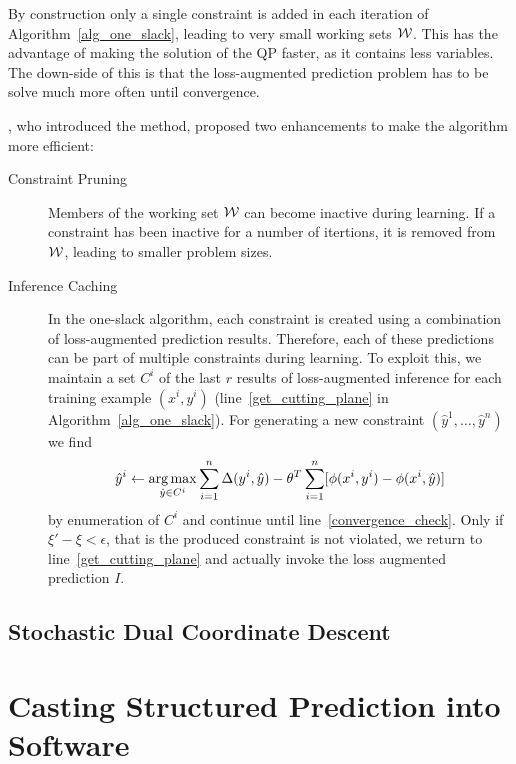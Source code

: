 By construction only a single constraint is added in each iteration of
Algorithm~\ref{alg_one_slack}, leading to very small working sets $\mathcal{W}$.
This has the advantage of making the solution of the QP faster, as it contains
less variables. The down-side of this is that the loss-augmented prediction
problem has to be solve much more often until convergence.

\citet{joachims2009cutting}, who introduced the method, proposed two enhancements
to make the algorithm more efficient:
\begin{description}
    \item[Constraint Pruning] Members of the working set $\mathcal{W}$ can become inactive during learning.
        If a constraint has been inactive for a number of itertions, it is removed from $\mathcal{W}$, leading
        to smaller problem sizes.
    \item[Inference Caching] In the one-slack algorithm, each constraint is
        created using a combination of loss-augmented prediction results.
        Therefore, each of these predictions can be part of multiple
        constraints during learning.
        To exploit this, we maintain a set $C^i$ of the last $r$ results of
        loss-augmented inference for each training example $(x^i, y^i)$
        (line~\ref{get_cutting_plane} in Algorithm~\ref{alg_one_slack}).
        For generating a new constraint $(\hat{y}^1, \dotsc, \hat{y}^n)$ we
        find
        \[ \hat{y}^i \leftarrow \operatorname*{arg\,max}_{\hat{y}\in C^i} \sum_{i=1}^n
            \Delta(y^i, \hat{y}) - \theta^T \sum_{i=1}^n [\phi(x^i, y^i) -
                \phi(x^i, \hat{y})] \]
        by enumeration of $C^i$ and continue until
        line~\ref{convergence_check}.  Only if $\xi' - \xi < \epsilon$, that is
        the produced constraint is not violated, we return to
        line~\ref{get_cutting_plane} and actually invoke the loss augmented
        prediction $I$.
\end{description}


\subsection{Stochastic Dual Coordinate Descent}


\section{Casting Structured Prediction into Software}\label{sec:api}

